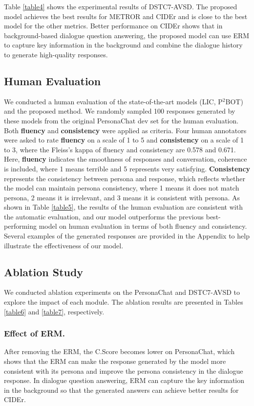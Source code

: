 \documentclass[letterpaper]{article} \usepackage{aaai23}  \usepackage{times}  \usepackage{helvet}  \usepackage{courier}  \usepackage[hyphens]{url}  \usepackage{graphicx} \urlstyle{rm} \def\UrlFont{\rm}  \usepackage{natbib}  \usepackage{caption} \frenchspacing  \setlength{\pdfpagewidth}{8.5in}  \setlength{\pdfpageheight}{11in}  \usepackage{algorithm}
\begin{document}
Table \ref{table4} shows the experimental results of DSTC7-AVSD. The proposed model achieves the best results for METROR and CIDEr and is close to the best model for the other metrics. Better performance on CIDEr shows that in background-based dialogue question answering, the proposed model can use ERM to capture key information in the background and combine the dialogue history to generate high-quality responses. 

\subsection{Human Evaluation}
We conducted a human evaluation of the state-of-the-art models (LIC, P$^2$BOT) and the proposed method. We randomly sampled 100 responses generated by these models from the original PersonaChat dev set for the human evaluation. Both \textbf{fluency} and \textbf{consistency} were applied as criteria. Four human annotators were asked to rate \textbf{fluency} on a scale of 1 to 5 and \textbf{consistency} on a scale of 1 to 3, where the Fleiss’s kappa of fluency and consistency are 0.578 and 0.671. Here, \textbf{fluency} indicates the smoothness of responses and conversation, coherence is included, where 1 means terrible and 5 represents very satisfying. \textbf{Consistency} represents the consistency between persona and response, which reflects whether the model can maintain persona consistency, where 1 means it does not  match persona, 2 means it is irrelevant, and 3 means it is consistent with persona. As shown in Table \ref{table5}, the results of the human evaluation are consistent with the automatic evaluation, and our model outperforms the previous best-performing model on human evaluation in terms of both fluency and consistency. Several examples of the generated responses are provided in the Appendix to help illustrate the effectiveness of our model. 

\subsection{Ablation Study}
We conducted ablation experiments on the PersonaChat and DSTC7-AVSD to explore the impact of each module. The ablation results are presented in Tables \ref{table6} and \ref{table7}, respectively. 

\subsubsection{Effect of ERM.}
After removing the ERM, the C.Score becomes lower on PersonaChat, which shows that the ERM can make the response generated by the model more consistent with its persona and improve the persona consistency in the dialogue response. In dialogue question answering, ERM can capture the key information in the background so that the generated answers can achieve better results for CIDEr.
\end{document}
